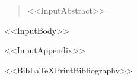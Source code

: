 \documentclass[<<DocumentClassOptions>>]{article}
\begin{document}
\begin{abstract}
<<InputAbstract>>
\end{abstract}

<<InputBody>>

\appendix
<<InputAppendix>>

<<BibLaTeXPrintBibliography>>
\end{document}
